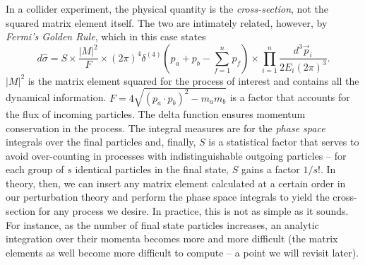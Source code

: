 In a collider experiment, the physical quantity is the \emph{cross-section}, not the squared matrix element itself. The two are intimately related, however, by \emph{Fermi's Golden Rule}, which in this case states
\begin{equation}
d \hat{\sigma} = S \times \frac{|M|^2}{F} \times (2 \pi)^4 \delta^{(4)}(p_a + p_b - \sum_{f=1}^n p_f) \times \prod_{i=1}^n \frac{d^3 \vec{p}_i}{2 E_i (2 \pi)^3}.
\end{equation}
$|M|^2$ is the matrix element squared for the process of interest and contains all the dynamical information. $F = 4 \sqrt{(p_a \cdot p_b)^2 - m_a m_b}$  is a factor that accounts for the flux of incoming particles. The delta function ensures momentum conservation in the process. The integral measures are for the \emph{phase space} integrals over the final particles and, finally, $S$ is a statistical factor that serves to avoid over-counting in processes with indistinguishable outgoing particles -- for each group of $s$ identical particles in the final state, $S$ gains a factor $1/s!$. In theory, then, we can insert any matrix element calculated at a certain order in our perturbation theory and perform the phase space integrals to yield the cross-section for any process we desire. In practice, this is not as simple as it sounds. For instance, as the number of final state particles increases, an analytic integration over their momenta becomes more and more difficult (the matrix elements as well become more difficult to compute -- a point we will revisit later). 

